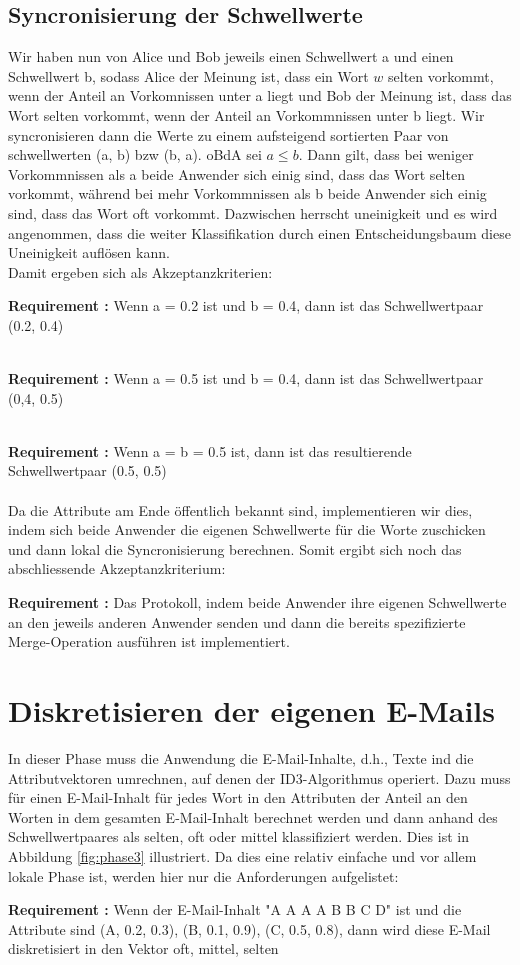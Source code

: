 \documentclass{article}
\newcounter{requirementscount}{}
\newcommand{\requirement}[1] {
        \addtocounter{requirementscount}{1}
        {\bf Requirement \therequirementscount:} #1\\
    }
\begin{document}
\subsection{Syncronisierung der Schwellwerte}
Wir haben nun von Alice und Bob jeweils einen Schwellwert a und einen
Schwellwert b, sodass Alice der Meinung ist, dass ein Wort \(w\)
selten vorkommt, wenn der Anteil an Vorkomnissen unter a liegt und
Bob der Meinung ist, dass das Wort selten vorkommt, wenn der Anteil an
Vorkommnissen unter b liegt. Wir syncronisieren dann die Werte zu einem
aufsteigend sortierten Paar von schwellwerten (a, b) bzw (b, a). oBdA sei
\(a \leq b\). Dann gilt, dass bei weniger Vorkommnissen als a beide Anwender
sich einig sind, dass das Wort selten vorkommt, w\"ahrend bei mehr Vorkommnissen
als b beide Anwender sich einig sind, dass das Wort oft vorkommt. Dazwischen 
herrscht uneinigkeit und es wird angenommen, dass die weiter Klassifikation
durch einen Entscheidungsbaum diese Uneinigkeit aufl\"osen kann.\\
Damit ergeben sich als Akzeptanzkriterien:\\
\requirement{Wenn a = 0.2 ist und b = 0.4, dann ist das Schwellwertpaar
(0.2, 0.4)}\\
\requirement{Wenn a = 0.5 ist und b = 0.4, dann ist das Schwellwertpaar
(0,4, 0.5)}\\
\requirement{Wenn a = b = 0.5 ist, dann ist das resultierende Schwellwertpaar
(0.5, 0.5)}\\
Da die Attribute am Ende \"offentlich bekannt sind, implementieren wir
dies, indem sich beide Anwender die eigenen Schwellwerte f\"ur die Worte
zuschicken und dann lokal die Syncronisierung berechnen. Somit ergibt
sich noch das abschliessende Akzeptanzkriterium:\\
\requirement{Das Protokoll, indem beide Anwender ihre eigenen Schwellwerte
an den jeweils anderen Anwender senden und dann die bereits spezifizierte
Merge-Operation ausf\"uhren ist implementiert.}

\pagebreak %
\section{Diskretisieren der eigenen E-Mails}
In dieser Phase muss die Anwendung die E-Mail-Inhalte, d.h., Texte ind
die Attributvektoren umrechnen, auf denen der ID3-Algorithmus operiert.
Dazu muss f\"ur einen E-Mail-Inhalt f\"ur jedes Wort in den Attributen
der Anteil an den Worten in dem gesamten E-Mail-Inhalt berechnet werden
und dann anhand des Schwellwertpaares als selten, oft oder mittel
klassifiziert werden. Dies ist in Abbildung \ref{fig:phase3} illustriert.
Da dies eine relativ einfache und vor allem lokale Phase ist, werden
hier nur die Anforderungen aufgelistet:\\
\requirement{Wenn der E-Mail-Inhalt "A A A A B B C D" ist und die Attribute
sind (A, 0.2, 0.3), (B, 0.1, 0.9), (C, 0.5, 0.8),
dann wird diese E-Mail diskretisiert in den Vektor oft, mittel, selten}
\end{document}
